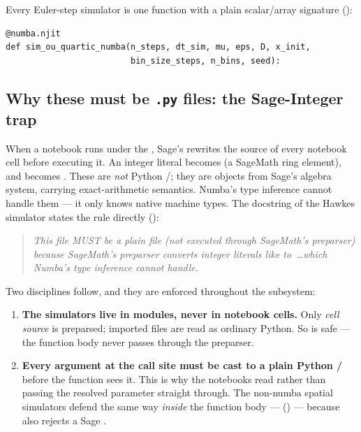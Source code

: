 Every Euler-step simulator is one  function with a plain
scalar/array signature ():

\begin{lstlisting}
@numba.njit
def sim_ou_quartic_numba(n_steps, dt_sim, mu, eps, D, x_init,
                         bin_size_steps, n_bins, seed):
\end{lstlisting}

\subsection{Why these must be \texttt{.py} files: the Sage-Integer trap}

When a notebook runs under the , Sage's 
rewrites the source of every notebook cell before executing it. An integer literal
 becomes  (a SageMath ring element), and 
becomes . These are \emph{not} Python /;
they are objects from Sage's algebra system, carrying exact-arithmetic semantics.
Numba's type inference cannot handle them --- it only knows native machine types.
The docstring of the Hawkes simulator states the rule directly
():

\begin{quote}\itshape
This file MUST be a plain  file (not executed through SageMath's
preparser) because SageMath's preparser converts integer literals like 
to \,\ldots which Numba's type inference cannot handle.
\end{quote}

Two disciplines follow, and they are enforced throughout the subsystem:

\begin{enumerate}
  \item \textbf{The simulators live in  modules, never in notebook
        cells.} Only \emph{cell source} is preparsed; imported  files
        are read as ordinary Python. So  is safe --- the function body never passes
        through the preparser.
  \item \textbf{Every argument at the call site must be cast to a plain Python
        /} before the  function sees it. This is
        why the notebooks read  rather than passing the
        resolved parameter straight through. The non-numba spatial simulators
        defend the same way \emph{inside} the function body ---  ()
        --- because  also rejects a Sage
        .
\end{enumerate}

